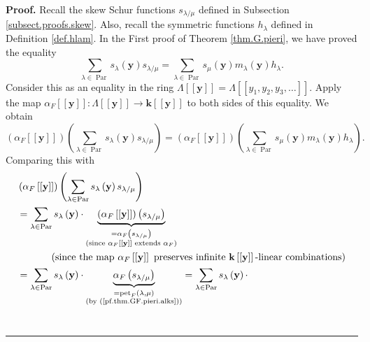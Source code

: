 \documentclass[numbers=enddot,12pt,final,onecolumn,notitlepage]{scrartcl}%
\theoremstyle{definition}
\newenvironment{proof}[1][Proof]{\noindent\textbf{#1.} }{\ \rule{0.5em}{0.5em}}
\let\sumnonlimits\sum
\renewcommand{\sum}{\sumnonlimits\limits}
\newenvironment{verlong}{}{}
\begin{document}
\begin{verlong}
\begin{proof}
Recall the skew Schur functions $s_{\lambda/\mu}$ defined in Subsection
\ref{subsect.proofs.skew}. Also, recall the symmetric functions $h_{\lambda}$
defined in Definition \ref{def.hlam}. In the First proof of Theorem
\ref{thm.G.pieri}, we have proved the equality%
\[
\sum_{\lambda\in\operatorname*{Par}}s_{\lambda}\left(  \mathbf{y}\right)
s_{\lambda/\mu}=\sum_{\lambda\in\operatorname*{Par}}s_{\mu}\left(
\mathbf{y}\right)  m_{\lambda}\left(  \mathbf{y}\right)  h_{\lambda}.
\]
Consider this as an equality in the ring $\Lambda\left[  \left[
\mathbf{y}\right]  \right]  =\Lambda\left[  \left[  y_{1},y_{2},y_{3}%
,\ldots\right]  \right]  $. Apply the map $\alpha_{F}\left[  \left[
\mathbf{y}\right]  \right]  :\Lambda\left[  \left[  \mathbf{y}\right]
\right]  \rightarrow\mathbf{k}\left[  \left[  \mathbf{y}\right]  \right]  $ to
both sides of this equality. We obtain%
\[
\left(  \alpha_{F}\left[  \left[  \mathbf{y}\right]  \right]  \right)  \left(
\sum_{\lambda\in\operatorname*{Par}}s_{\lambda}\left(  \mathbf{y}\right)
s_{\lambda/\mu}\right)  =\left(  \alpha_{F}\left[  \left[  \mathbf{y}\right]
\right]  \right)  \left(  \sum_{\lambda\in\operatorname*{Par}}s_{\mu}\left(
\mathbf{y}\right)  m_{\lambda}\left(  \mathbf{y}\right)  h_{\lambda}\right)
.
\]
Comparing this with%
\begin{align*}
&  \left(  \alpha_{F}\left[  \left[  \mathbf{y}\right]  \right]  \right)
\left(  \sum_{\lambda\in\operatorname*{Par}}s_{\lambda}\left(  \mathbf{y}%
\right)  s_{\lambda/\mu}\right) \\
&  =\sum_{\lambda\in\operatorname*{Par}}s_{\lambda}\left(  \mathbf{y}\right)
\cdot\underbrace{\left(  \alpha_{F}\left[  \left[  \mathbf{y}\right]  \right]
\right)  \left(  s_{\lambda/\mu}\right)  }_{\substack{=\alpha_{F}\left(
s_{\lambda/\mu}\right)  \\\text{(since }\alpha_{F}\left[  \left[
\mathbf{y}\right]  \right]  \text{ extends }\alpha_{F}\text{)}}}\\
&  \ \ \ \ \ \ \ \ \ \ \left(  \text{since the map }\alpha_{F}\left[  \left[
\mathbf{y}\right]  \right]  \text{ preserves infinite }\mathbf{k}\left[
\left[  \mathbf{y}\right]  \right]  \text{-linear combinations}\right) \\
&  =\sum_{\lambda\in\operatorname*{Par}}s_{\lambda}\left(  \mathbf{y}\right)
\cdot\underbrace{\alpha_{F}\left(  s_{\lambda/\mu}\right)  }%
_{\substack{=\operatorname*{pet}\nolimits_{F}\left(  \lambda,\mu\right)
\\\text{(by (\ref{pf.thm.GF.pieri.alks}))}}}=\sum_{\lambda\in
\operatorname*{Par}}s_{\lambda}\left(  \mathbf{y}\right)  \cdot

\end{align*}
\end{proof}
\end{verlong}
\end{document}

